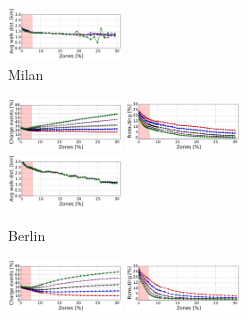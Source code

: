 \begin{figure}[t!]
\begin{center}
\begin{subfigure}{\textwidth}
            \includegraphics[width=0.33\textwidth]{figures/cut_Milano_AvgWalkedDistanceVsZones_Policy_44_tt-25_100_4.pdf}
             \caption{Milan}
             \label{fig:6_7_zone_vs_metric_milano}
         \end{subfigure}
         \begin{subfigure}{\textwidth}
         	\includegraphics[width=0.33\textwidth]{figures/cut_Berlino_AmountRechargePercVsZones_Policy_44_tt-25_100_4.pdf}
            \includegraphics[width=0.33\textwidth]{figures/cut_Berlino_ReroutePercVsZones_Policy_44_tt-25_100_4.pdf}
            \includegraphics[width=0.33\textwidth]{figures/cut_Berlino_AvgWalkedDistanceVsZones_Policy_44_tt-25_100_4.pdf}
             \caption{Berlin}
             \label{fig:6_7_zone_vs_metric_berlino}
         \end{subfigure}
         \begin{subfigure}{\textwidth}
        	\includegraphics[width=0.33\textwidth]{figures/cut_Vancouver_AmountRechargePercVsZones_Policy_44_tt-25_100_4.pdf}
            \includegraphics[width=0.33\textwidth]{figures/cut_Vancouver_ReroutePercVsZones_Policy_44_tt-25_100_4.pdf}

\end{subfigure}
\end{center}
\end{figure}
